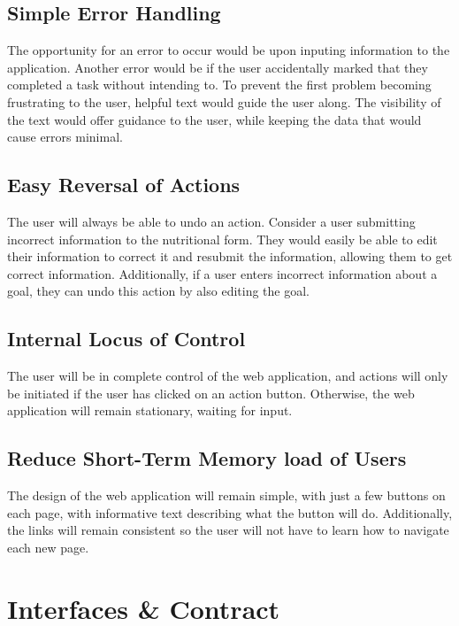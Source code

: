 \documentclass[a4paper]{article}
\begin{document}
\subsection{Simple Error Handling}
The opportunity for an error to occur would be upon inputing information to the application. Another error would be if the user accidentally marked that they completed a task without intending to. To prevent the first problem becoming frustrating to the user, helpful text would guide the user along. The visibility of the text would offer guidance to the user, while keeping the data that would cause errors minimal. 

\subsection{Easy Reversal of Actions}
The user will always be able to undo an action. Consider a user submitting incorrect information to the nutritional form. They would easily be able to edit their information to correct it and resubmit the information, allowing them to get correct information. Additionally, if a user enters incorrect information about a goal, they can undo this action by also editing the goal. 

\subsection{Internal Locus of Control}

The user will be in complete control of the web application, and actions will only be initiated if the user has clicked on an action button. Otherwise, the web application will remain stationary, waiting for input.

\subsection{Reduce Short-Term Memory load of Users}

The design of the web application will remain simple, with just a few buttons on each page, with informative text describing what the button will do. Additionally, the links will remain consistent so the user will not have to learn how to navigate each new page.

\section{Interfaces \& Contract}
\end{document}
